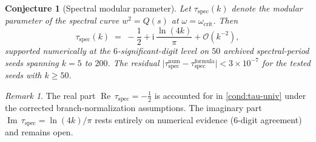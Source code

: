 \documentclass[11pt,a4paper]{article}
\theoremstyle{plain}
\newtheorem{conjecture}[theorem]{Conjecture}
\theoremstyle{definition}
\theoremstyle{remark}
\newtheorem{remark}[theorem]{Remark}
\DeclareMathOperator{\Real}{Re}
\DeclareMathOperator{\Imag}{Im}
\newcommand{\ii}{\mathrm{i}}
\newcommand{\Oo}{\mathcal{O}}
\begin{document}
\begin{conjecture}[Spectral modular parameter]
\label{conj:tau-spec}
Let $\tau_{\mathrm{spec}}(k)$ denote the modular parameter of the
spectral curve $w^2 = Q(s)$ at $\omega = \omega_{\mathrm{crit}}$.
Then
\begin{equation}\label{eq:tau-spec}
  \tau_{\mathrm{spec}}(k)
  \;=\; -\frac{1}{2} + \ii\,\frac{\ln(4k)}{\pi} + \Oo(k^{-2}),
\end{equation}
supported numerically at the $6$-significant-digit level on $50$ archived
spectral-period seeds spanning $k=5$ to $200$.  The residual
$\lvert\tau_{\mathrm{spec}}^{\mathrm{num}} - \tau_{\mathrm{spec}}^%
  {\mathrm{formula}}\rvert < 3 \times 10^{-7}$
for the tested seeds with $k \ge 50$.
\end{conjecture}

\begin{remark}
The real part $\Real\,\tau_{\mathrm{spec}} = -\tfrac12$ is
accounted for in \cref{cond:tau-univ} under the corrected
branch-normalization assumptions.  The imaginary part
$\Imag\,\tau_{\mathrm{spec}} = \ln(4k)/\pi$ rests entirely on
numerical evidence ($6$-digit agreement) and remains open.
\end{remark}
\end{document}
